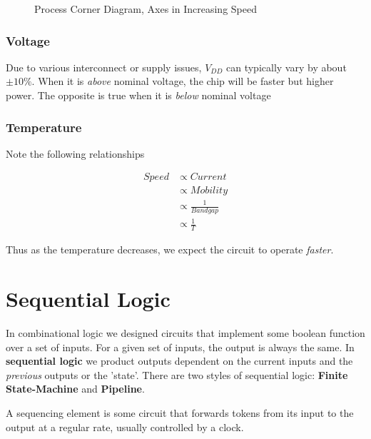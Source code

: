 \documentclass[11pt]{report}
\begin{document}
\begin{figure}[t]
\centering
{}
\caption{Process Corner Diagram, Axes in Increasing Speed}\label{fig:process-corners}
\end{figure}

\subsection{Voltage}
Due to various interconnect or supply issues, $V_{DD}$ can typically vary by about $\pm 10\%$. When it is \textit{above} nominal voltage, the chip will be faster but higher power. The opposite is true when it is \textit{below} nominal voltage

\subsection{Temperature}
Note the following relationships

\begin{align}
	Speed &\propto Current\\
		  &\propto Mobility\\
		  &\propto \frac{1}{Bandgap}\\
		  &\propto \frac{1}{T}
\end{align}

Thus as the temperature decreases, we expect the circuit to operate \textit{faster}.


\chapter{Sequential Logic}
In combinational logic we designed circuits that implement some boolean function over a set of inputs. For a given set of inputs, the output is always the same. In \textbf{sequential logic} we product outputs dependent on the current inputs and the \textit{previous} outputs or the 'state'. There are two styles of sequential logic: \textbf{Finite State-Machine} and \textbf{Pipeline}.

A sequencing element is some circuit that forwards tokens from its input to the output at a regular rate, usually controlled by a clock.
\end{document}
